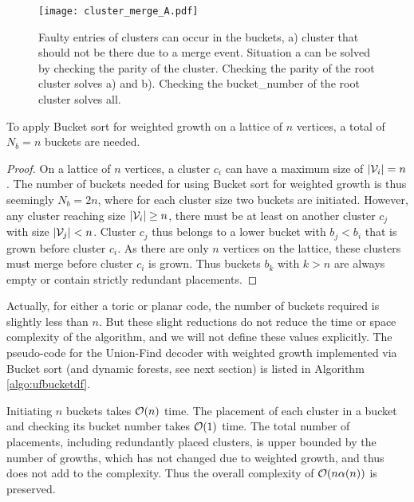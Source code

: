 \begin{figure}
  \centering
  \texttt{[image: cluster\_merge\_A.pdf]}
  \caption{Faulty entries of clusters can occur in the buckets, a) cluster that should not be there due to a merge event. Situation a can be solved by checking the parity of the cluster. Checking the parity of the root cluster solves a) and b). Checking the bucket\_number of the root cluster solves all.}\label{3.fig.clustermergeB}
\end{figure}


\begin{lemma}\label{lem:numbuckets}
  To apply Bucket sort for weighted growth on a lattice of $n$ vertices, a total of $N_b = n$ buckets are needed. 
\end{lemma}
\begin{proof}
  On a lattice of $n$ vertices, a cluster $c_i$ can have a maximum size of $|\mathcal{V}_i|=n$. The number of buckets needed for using Bucket sort for weighted growth is thus seemingly $N_b = 2n$, where for each cluster size two buckets are initiated. However, any cluster reaching size $|\mathcal{V}_i|\geq n$, there must be at least on another cluster $c_j$ with size $|\mathcal{V}_j|<n$. Cluster $c_j$ thus belongs to a lower bucket with $b_j < b_i$ that is grown before cluster $c_i$. As there are only $n$ vertices on the lattice, these clusters must merge before cluster $c_i$ is grown. Thus buckets $b_k$ with $k>n$ are always empty or contain strictly redundant placements.
\end{proof}

Actually, for either a toric or planar code, the number of buckets required is slightly less than $n$. But these slight reductions do not reduce the time or space complexity of the algorithm, and we will not define these values explicitly. The pseudo-code for the Union-Find decoder with weighted growth implemented via Bucket sort (and dynamic forests, see next section) is listed in Algorithm \ref{algo:ufbucketdf}. 

Initiating $n$ buckets takes $\mathcal{O}(n)$ time. The placement of each cluster in a bucket and checking its bucket number takes $\mathcal{O}(1)$ time. The total number of placements, including redundantly placed clusters, is upper bounded by the number of growths, which has not changed due to weighted growth, and thus does not add to the complexity. Thus the overall complexity of $\mathcal{O}(n\alpha(n))$ is preserved. 

